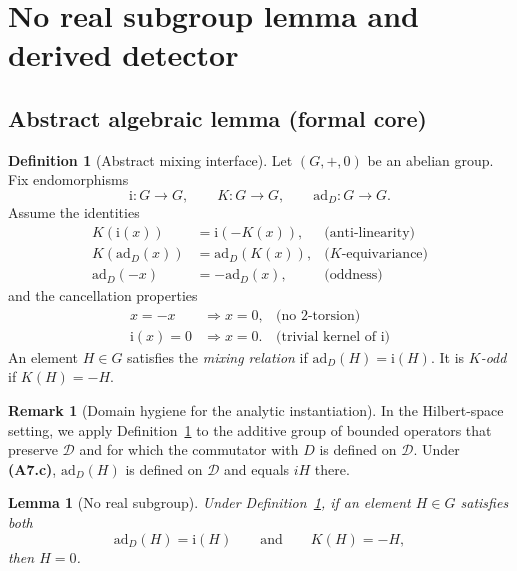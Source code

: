 \documentclass[aps,prl,reprint]{revtex4-2}
\theoremstyle{definition}
\newtheorem{definition}{Definition}[section]
\newtheorem{remark}{Remark}[section]
\theoremstyle{plain}
\newtheorem{lemma}{Lemma}[section]
\begin{document}
\section{No real subgroup lemma and derived detector}
\label{sec:mixing-detector}

\subsection{Abstract algebraic lemma (formal core)}\label{subsec:limited-scope-theorem-translation-clean-001}

\begin{definition}[Abstract mixing interface]
\label{def:abstract-mixing}
Let $(G,+,0)$ be an abelian group. Fix endomorphisms
\[\mathrm{i}:G\to G,\qquad K:G\to G,\qquad \mathrm{ad}_D:G\to G.\]
Assume the identities
\begin{align}
  K(\mathrm{i}(x)) &= \mathrm{i}(-K(x)), &\text{(anti-linearity)}\\
  K(\mathrm{ad}_D(x)) &= \mathrm{ad}_D(K(x)), &\text{($K$-equivariance)}\\
  \mathrm{ad}_D(-x) &= -\mathrm{ad}_D(x), &\text{(oddness)}
\end{align}
and the cancellation properties
\begin{align}
  x=-x &\Rightarrow x=0, &\text{(no $2$-torsion)}\\
  \mathrm{i}(x)=0 &\Rightarrow x=0. &\text{(trivial kernel of $\mathrm{i}$)}
\end{align}
An element $H\in G$ satisfies the \emph{mixing relation} if $\mathrm{ad}_D(H)=\mathrm{i}(H)$.
It is \emph{$K$-odd} if $K(H)=-H$.

\end{definition}

\begin{remark}[Domain hygiene for the analytic instantiation]
In the Hilbert-space setting, we apply Definition~\ref{def:abstract-mixing} to the
additive group of bounded operators that preserve $\mathcal D$ and for which the
commutator with $D$ is defined on $\mathcal D$. Under \textbf{(A7.c)}, $\mathrm{ad}_D(H)$
is defined on $\mathcal D$ and equals $iH$ there.
\end{remark}

\begin{lemma}[No real subgroup]
\label{lem:no-real-subgroup}
Under Definition~\ref{def:abstract-mixing}, if an element $H\in G$ satisfies both
\[\mathrm{ad}_D(H)=\mathrm{i}(H)\qquad\text{and}\qquad K(H)=-H,\]
then $H=0$.

\end{lemma}
\end{document}
